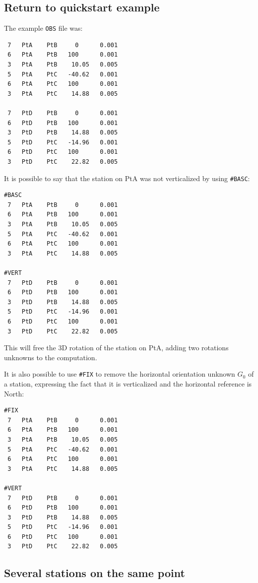 \subsection{Return to quickstart example}
The example \texttt{OBS} file was:
\begin{verbatim}
 7   PtA    PtB     0      0.001
 6   PtA    PtB   100      0.001
 3   PtA    PtB    10.05   0.005
 5   PtA    PtC   -40.62   0.001
 6   PtA    PtC   100      0.001
 3   PtA    PtC    14.88   0.005

 7   PtD    PtB     0      0.001
 6   PtD    PtB   100      0.001
 3   PtD    PtB    14.88   0.005
 5   PtD    PtC   -14.96   0.001
 6   PtD    PtC   100      0.001
 3   PtD    PtC    22.82   0.005
\end{verbatim}

It is possible to say that the station on PtA was not verticalized by using \texttt{\#BASC}:
\begin{verbatim}
#BASC
 7   PtA    PtB     0      0.001
 6   PtA    PtB   100      0.001
 3   PtA    PtB    10.05   0.005
 5   PtA    PtC   -40.62   0.001
 6   PtA    PtC   100      0.001
 3   PtA    PtC    14.88   0.005

#VERT
 7   PtD    PtB     0      0.001
 6   PtD    PtB   100      0.001
 3   PtD    PtB    14.88   0.005
 5   PtD    PtC   -14.96   0.001
 6   PtD    PtC   100      0.001
 3   PtD    PtC    22.82   0.005
\end{verbatim}

This will free the 3D rotation of the station on PtA, adding two rotations unknowns to the computation.
\newline

It is also possible to use \texttt{\#FIX} to remove the horizontal orientation unknown $G_0$ of a station, expressing the fact that it
is verticalized and the horizontal reference is North:
\begin{verbatim}
#FIX
 7   PtA    PtB     0      0.001
 6   PtA    PtB   100      0.001
 3   PtA    PtB    10.05   0.005
 5   PtA    PtC   -40.62   0.001
 6   PtA    PtC   100      0.001
 3   PtA    PtC    14.88   0.005

#VERT
 7   PtD    PtB     0      0.001
 6   PtD    PtB   100      0.001
 3   PtD    PtB    14.88   0.005
 5   PtD    PtC   -14.96   0.001
 6   PtD    PtC   100      0.001
 3   PtD    PtC    22.82   0.005
\end{verbatim}


\subsection{Several stations on the same point}
\label{subsec:SeveralStationsSamePoint}

